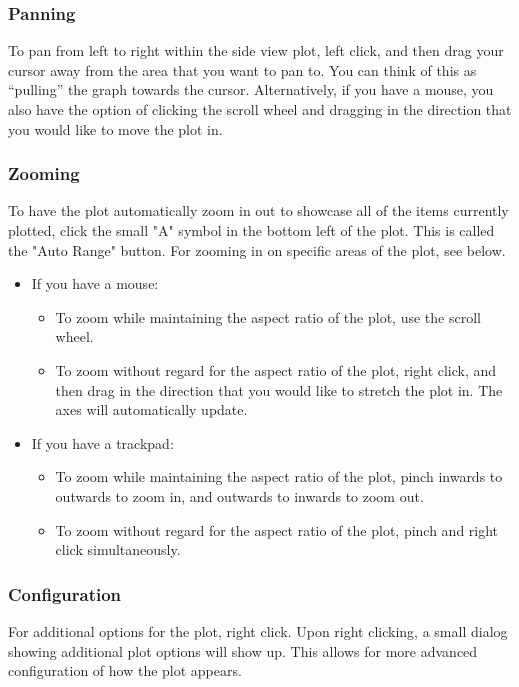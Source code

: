 \documentclass[
titlepage,
fontsize=12pt
]{article}
\begin{document}
	\subsubsection{Panning}
	To pan from left to right within the side view plot, left click, and then drag your cursor away from the area that you want to pan to. You can think of this as “pulling” the graph towards the cursor. Alternatively, if you have a mouse, you also have the option of clicking the scroll wheel and dragging in the direction that you would like to move the plot in.
	
	\subsubsection{Zooming}
	
	To have the plot automatically zoom in out to showcase all of the items currently plotted, click the small "A" symbol in the bottom left of the plot. This is called the "Auto Range" button. For zooming in on specific areas of the plot, see below.
	
	\begin{itemize}
		\item If you have a mouse:
			\begin{itemize}
				\item To zoom while maintaining the aspect ratio of the plot, use the scroll wheel.
				\item To zoom without regard for the aspect ratio of the plot, right click, and then drag in the direction that you would like to stretch the plot in. The axes will automatically update.
			\end{itemize}
	
		\item If you have a trackpad:
			\begin{itemize}
				\item To zoom while maintaining the aspect ratio of the plot, pinch inwards to outwards to zoom in, and outwards to inwards to zoom out.
				\item To zoom without regard for the aspect ratio of the plot, pinch and right click simultaneously. 
			\end{itemize}
	\end{itemize}

	\subsubsection{Configuration}
	For additional options for the plot, right click. Upon right clicking, a small dialog showing additional plot options will show up. This allows for more advanced configuration of how the plot appears.
	
\end{document}
